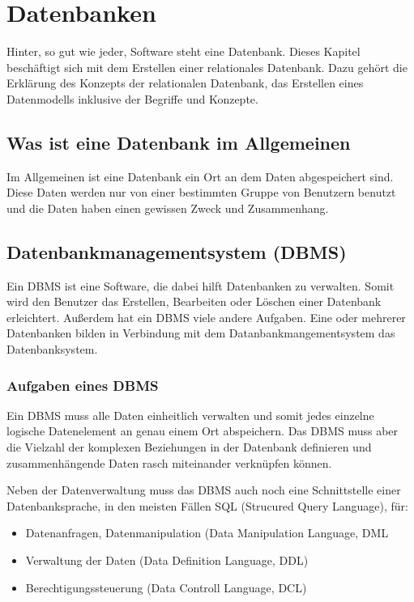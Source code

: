 \chapter{Datenbanken}
\label{cha:Datenbankerstellung}
\begin{flushleft}

Hinter, so gut wie jeder, Software steht eine Datenbank. Dieses Kapitel beschäftigt sich mit dem Erstellen einer relationales Datenbank. Dazu gehört die Erklärung des Konzepts der relationalen Datenbank, das Erstellen eines Datenmodells inklusive der Begriffe und Konzepte. 

\section{Was ist eine Datenbank im Allgemeinen}
 
 Im Allgemeinen ist eine Datenbank ein Ort an dem Daten abgespeichert sind. Diese Daten werden nur von einer bestimmten Gruppe von Benutzern benutzt und die Daten haben einen gewissen Zweck und Zusammenhang. 
 
 \section{Datenbankmanagementsystem (DBMS)}
 
 Ein DBMS ist eine Software, die dabei hilft Datenbanken zu verwalten. Somit wird den Benutzer das Erstellen, Bearbeiten oder Löschen einer Datenbank erleichtert. Außerdem hat ein DBMS viele andere Aufgaben. Eine oder mehrerer Datenbanken bilden in Verbindung mit dem Datanbankmangementsystem das Datenbanksystem.
 
 \subsection{Aufgaben eines DBMS}
 
 Ein DBMS muss alle Daten einheitlich verwalten und somit jedes einzelne logische Datenelement an genau einem Ort abspeichern. Das DBMS muss aber die Vielzahl der komplexen Beziehungen in der Datenbank definieren  und zusammenhängende Daten rasch miteinander verknüpfen können.
 
 Neben der Datenverwaltung muss das DBMS auch noch eine Schnittstelle einer Datenbanksprache, in den meisten Fällen SQL (Strucured Query Language), für: 
\begin{itemize}
\item Datenanfragen, Datenmanipulation (Data Manipulation Language, DML
\end{itemize}
\begin{itemize}
\item Verwaltung der Daten (Data Definition Language, DDL)
\end{itemize}
\begin{itemize}
\item Berechtigungssteuerung (Data Controll Language, DCL)
\end{itemize}
 

\end{flushleft}
